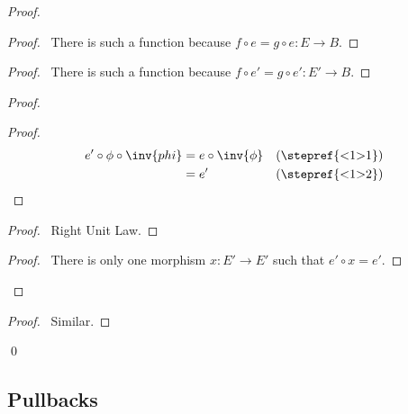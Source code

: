 \begin{proof}
  \pf
  \begin{proof}
    \pf\ There is such a function because $f \circ e = g \circ e : E \rightarrow 
    B$.
  \end{proof}
  \begin{proof}
    \pf\ There is such a function because $f \circ e' = g \circ e' : E' 
    \rightarrow B$.
  \end{proof}
  \begin{proof}
    \begin{proof}
      \pf
      \begin{align*}
        e' \circ \phi \circ \inv{phi} & = e \circ \inv{\phi} & 
        (\text{\stepref{<1>1}}) \\
        & = e' & (\text{\stepref{<1>2}})
      \end{align*}
    \end{proof}
    \begin{proof}
      \pf\ Right Unit Law.
    \end{proof}
    \qedstep
    \begin{proof}
      \pf\ There is only one morphism $x : E' \rightarrow E'$  such that $e' 
      \circ x = e'$.
    \end{proof}
  \end{proof}
  \begin{proof}
    \pf\ Similar.
  \end{proof}
  \qed
\end{proof}

\subsection{Pullbacks}

